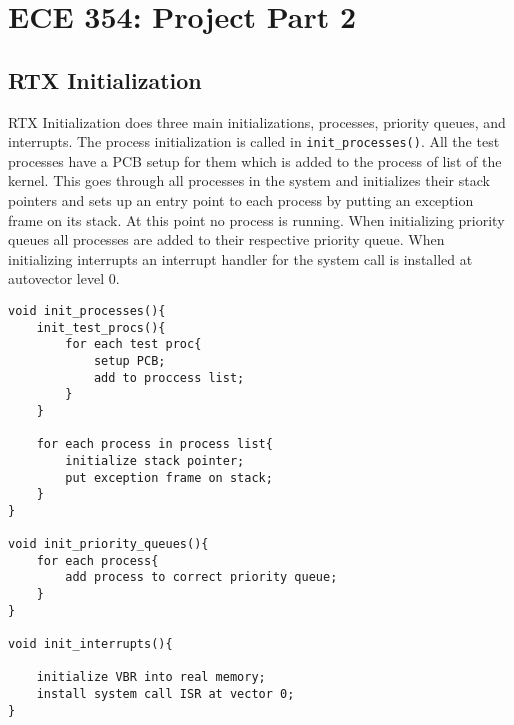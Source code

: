 \documentclass[oneside]{article}
\begin{document}
\lstset{language=C}
\section*{ECE 354: Project Part 2}
\subsection*{RTX Initialization} 
RTX Initialization does three main initializations, processes, priority queues, and interrupts. The process initialization is called in \texttt{init\_processes()}. All the test processes have a PCB setup for them which is added to the process of list of the kernel. This goes through all processes in the system and initializes their stack pointers and sets up an entry point to each process by putting an exception frame on its stack. At this point no process is running. When initializing priority queues all processes are added to their respective priority queue. When initializing interrupts an interrupt handler for the system call is installed at autovector level 0. 
\begin{lstlisting}
void init_processes(){
    init_test_procs(){
        for each test proc{
            setup PCB;
            add to proccess list;
        }    
    }

    for each process in process list{
        initialize stack pointer;
        put exception frame on stack;
    }
}

void init_priority_queues(){
    for each process{
        add process to correct priority queue;
    }
}

void init_interrupts(){

    initialize VBR into real memory;
    install system call ISR at vector 0;
}
    

\end{lstlisting}
\end{document}
